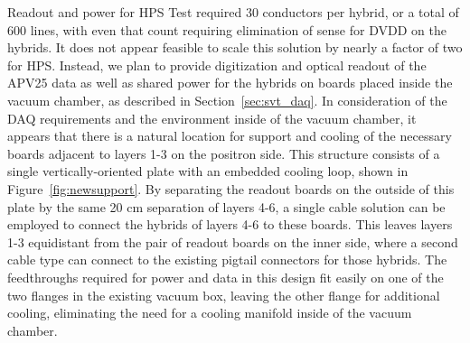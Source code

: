 Readout and power for HPS Test required 30 conductors per hybrid, or a total of 600 lines, with even that count requiring elimination of sense for DVDD on the hybrids.  It does not appear feasible to scale this solution by nearly a factor of two for HPS.  Instead, we plan to provide digitization and optical readout of the APV25 data as well as shared power for the hybrids on boards placed inside the vacuum chamber, as described in Section~\ref{sec:svt_daq}.  In consideration of the DAQ requirements and the environment inside of the vacuum chamber, it appears that there is a natural location for support and cooling of the necessary boards adjacent to layers 1-3 on the positron side.  This structure consists of a single vertically-oriented plate with an embedded cooling loop, shown in Figure~\ref{fig:newsupport}. By separating the readout boards on the outside of this plate by the same 20 cm separation of layers 4-6, a single cable solution can be employed to connect the hybrids of layers 4-6 to these boards.  This leaves layers 1-3 equidistant from the pair of readout boards on the inner side, where a second cable type can connect to the existing pigtail connectors for those hybrids.  The feedthroughs required for power and data in this design fit easily on one of the two flanges in the existing vacuum box, leaving the other flange for additional cooling, eliminating the need for a cooling manifold inside of the vacuum chamber.
